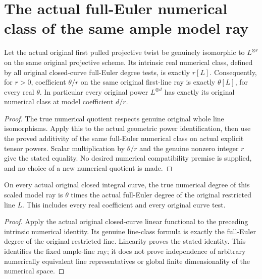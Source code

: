 \section{The actual full-Euler numerical class of the same ample model ray}
\label{sec:native-ample-model-numerical-classes}

\begin{theorem}
\label{thm:native-ample-model-numerical-class}
\leanok
{}
Let the actual original first pulled projective twist be genuinely isomorphic
to $L^{\otimes r}$ on the same original projective scheme. Its intrinsic real
numerical class, defined by all original closed-curve full-Euler degree tests,
is exactly $r[L]$. Consequently, for $r>0$, coefficient $\theta/r$ on the same
original first-line ray is exactly $\theta[L]$, for every real $\theta$.
In particular every original power $L^{\otimes d}$ has exactly its original
numerical class at model coefficient $d/r$.
\end{theorem}
\begin{proof}
The true numerical quotient respects genuine original whole line isomorphisms.
Apply this to the actual geometric power identification, then use the proved
additivity of the same full-Euler numerical class on actual explicit tensor
powers. Scalar multiplication by $\theta/r$ and the genuine nonzero integer
$r$ give the stated equality. No desired numerical compatibility premise is
supplied, and no choice of a new numerical quotient is made.
\end{proof}

\begin{theorem}
\label{thm:native-ample-model-curve-degree}
\leanok
{}
On every actual original closed integral curve, the true numerical degree of
this scaled model ray is $\theta$ times the actual full-Euler degree of the
original restricted line $L$. This includes every real coefficient and every
original curve test.
\end{theorem}
\begin{proof}
Apply the actual original closed-curve linear functional to the preceding
intrinsic numerical identity. Its genuine line-class formula is exactly the
full-Euler degree of the original restricted line. Linearity proves the stated
identity. This identifies the fixed ample-line ray; it does not prove
independence of arbitrary numerically equivalent line representatives or global
finite dimensionality of the numerical space.
\end{proof}
